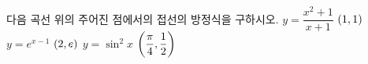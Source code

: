 다음 곡선 위의 주어진 점에서의 접선의 방정식을 구하시오.
 $y=\dfrac{x^2+1}{x+1}$ \quad $(1{,}\mkern3mu\mathopen{}1)$
 $y=e^{x-1}$ \quad $(2{,}\mkern3mu\mathopen{}e)$
 $y=\sin^2 x$ \quad $\left(\dfrac{\pi}{4}{,}\mkern3mu\mathopen{}\dfrac{1}{2}\right)$
